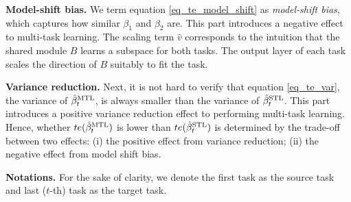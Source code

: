 \textbf{Model-shift bias.}
We term equation \eqref{eq_te_model_shift} as \textit{model-shift bias}, which captures how similar $\beta_1$ and $\beta_2$ are.
This part introduces a negative effect to multi-task learning.
The scaling term $\hat{v}$ corresponds to the intuition that the shared module $B$ learns a subspace for both tasks.
The output layer of each task scales the direction of $B$ suitably to fit the task.

\textbf{Variance reduction.}
Next, it is not hard to verify that equation \eqref{eq_te_var}, the variance of $\hat{\beta}_t^{\text{MTL}}$, is always smaller than the variance of $\hat{\beta}_t^{\text{STL}}$.
This part introduces a positive variance reduction effect to performing multi-task learning.
Hence, whether $te(\hat{\beta}_t^{\text{MTL}})$ is lower than $te(\hat{\beta}_t^{\text{STL}})$ is determined by the trade-off between two effects:
(i) the positive effect from variance reduction;
(ii) the negative effect from model shift bias.


\textbf{Notations.} For the sake of clarity, we denote the first task as the source task and last ($t$-th) task as the target task.
